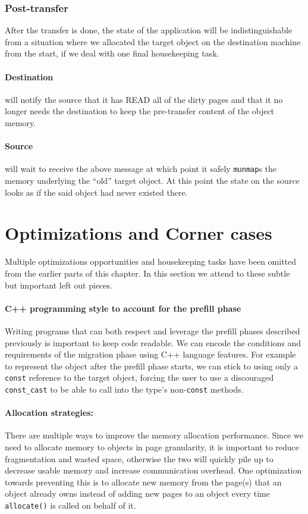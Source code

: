 \subsubsection{Post-transfer}
After the transfer is done, the state of the application will be
indistinguishable from a situation where we allocated the target object on
the destination machine from the start, if we deal with one final housekeeping
task.

\paragraph{Destination} will notify the source that it has READ all of the
dirty pages and that it no longer needs the destination to keep the
pre-transfer content of the object memory.

\paragraph{Source} will wait to receive the above message at which point it
safely \texttt{munmap}s the memory underlying the ``old'' target object. At
this point the state on the source looks as if the said object had never existed
there.


\section{Optimizations and Corner cases}
Multiple optimizations opportunities and housekeeping tasks have been omitted
from the earlier parts of this chapter. In this section we attend to these
subtle but important left out pieces.

\paragraph{C++ programming style to account for the prefill phase}
\label{sec:conform}
Writing programs that can both respect and leverage the prefill phases
described previously is important to keep code readable. We can encode the
conditions and requirements of the migration phase using C++ language features.
For example to represent the object after the prefill phase starts, we can
stick to using only a \texttt{const} reference to the target object,
forcing the user to use a discouraged \texttt{const\_cast} to be able to call
into the type's non-\texttt{const} methods.

\paragraph{Allocation strategies:} There are multiple ways to improve the memory
allocation performance. Since we need to allocate memory to objects in page
granularity, it is important to reduce fragmentation and wasted space,
otherwise the two will quickly pile up to decrease usable memory and increase
communication overhead. One optimization towards preventing this is to allocate
new memory from the page(s) that an object already owns instead of adding
new pages to an object every time \texttt{allocate()} is called on behalf of it.

